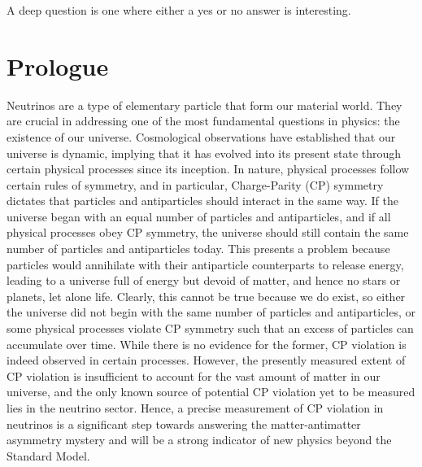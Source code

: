 \begin{savequote}[8cm]
\textlatin{A deep question is one where either a yes or no answer is interesting.}

\end{savequote}

\chapter{\label{ch:intro}Prologue} 

\minitoc

Neutrinos are a type of elementary particle that form our material world. 
They are crucial in addressing one of the most fundamental questions in physics: the existence of our universe. 
Cosmological observations have established that our universe is dynamic, implying that it has evolved into its present state through certain physical processes since its inception.
In nature, physical processes follow certain rules of symmetry, and in particular, Charge-Parity (CP) symmetry dictates that particles and antiparticles should interact in the same way. 
If the universe began with an equal number of particles and antiparticles, and if all physical processes obey CP symmetry, the universe should still contain the same number of particles and antiparticles today.
This presents a problem because particles would annihilate with their antiparticle counterparts to release energy, leading to a universe full of energy but devoid of matter, and hence no stars or planets, let alone life.
Clearly, this cannot be true because we do exist, so either the universe did not begin with the same number of particles and antiparticles, or some physical processes violate CP symmetry such that an excess of particles can accumulate over time. 
While there is no evidence for the former, CP violation is indeed observed in certain processes. 
However, the presently measured extent of CP violation is insufficient to account for the vast amount of matter in our universe, and the only known source of potential CP violation yet to be measured lies in the neutrino sector. 
Hence, a precise measurement of CP violation in neutrinos is a significant step towards answering the matter-antimatter asymmetry mystery and will be a strong indicator of new physics beyond the Standard Model.

